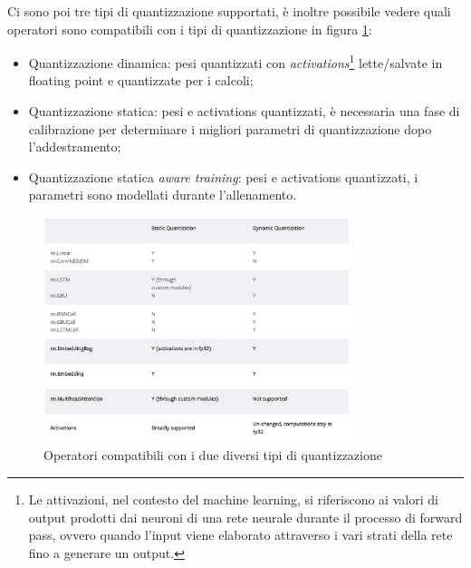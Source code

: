 Ci sono poi tre tipi di quantizzazione supportati, è inoltre possibile vedere quali operatori sono compatibili con i tipi di quantizzazione in figura \ref{fig:quantizationCoverage}:
\begin{itemize}
    \item Quantizzazione dinamica: pesi quantizzati con \textit{activations}\footnote{Le attivazioni, nel contesto del machine learning,
    si riferiscono ai valori di output prodotti dai neuroni di una rete neurale durante il processo di forward pass, ovvero quando l'input viene
    elaborato attraverso i vari strati della rete fino a generare un output.} lette/salvate in floating point e quantizzate per i calcoli;
    \item Quantizzazione statica: pesi e activations quantizzati, è necessaria una fase di calibrazione per determinare i migliori parametri di quantizzazione dopo l'addestramento;
    \item Quantizzazione statica \textit{aware training}: pesi e activations quantizzati, i parametri sono modellati durante l'allenamento.
\end{itemize}

\begin{figure}
    \centering
    \includegraphics[width=0.8\textwidth]{Immagini/operator coverage.png}
    \caption{Operatori compatibili con i due diversi tipi di quantizzazione}
    \label{fig:quantizationCoverage}
\end{figure}
    
